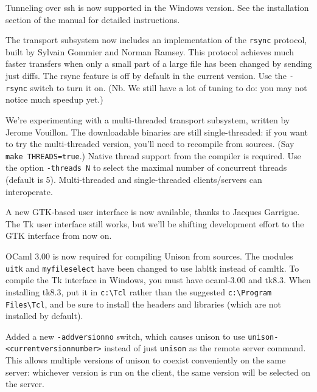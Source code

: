 \begin{changesfromversion}{1.231}
\item Tunneling over ssh is now supported in the Windows version.  See
the installation section of the manual for detailed instructions.

\item The transport subsystem now includes an implementation of the
\verb|rsync| protocol, built by Sylvain Gommier and Norman Ramsey.
This protocol achieves much faster transfers when only a small part of
a large file has been changed by sending just diffs.  The rsync
feature is off by default in the current version.  Use the
\verb|-rsync| switch to turn it on.  (Nb.  We still have a lot of
tuning to do: you may not notice much speedup yet.)

\item We're experimenting with a multi-threaded transport subsystem,
written by Jerome Vouillon.  The downloadable binaries are still
single-threaded: if you want to try the multi-threaded version, you'll
need to recompile from sources.  (Say \verb|make THREADS=true|.)
Native thread support from the compiler is required.  Use the option
\verb|-threads N| to select the maximal number of concurrent
threads (default is 5).  Multi-threaded
and single-threaded clients/servers can interoperate.

\item A new GTK-based user interface is now available, thanks to
Jacques Garrigue.  The Tk user interface still works, but we'll be
shifting development effort to the GTK interface from now on.
\item OCaml 3.00 is now required for compiling Unison from sources.
The modules \verb|uitk| and \verb|myfileselect| have been changed to
use labltk instead of camltk.  To compile the Tk interface in Windows,
you must have ocaml-3.00 and tk8.3.  When installing tk8.3, put it in
\verb|c:\Tcl| rather than the suggested \verb|c:\Program Files\Tcl|,
and be sure to install the headers and libraries (which are not
installed by default).

\item Added a new \verb|-addversionno| switch, which causes unison to
use \verb|unison-<currentversionnumber>| instead of just \verb|unison|
as the remote server command.  This allows multiple versions of unison
to coexist conveniently on the same server: whichever version is run
on the client, the same version will be selected on the server.
\end{changesfromversion}

